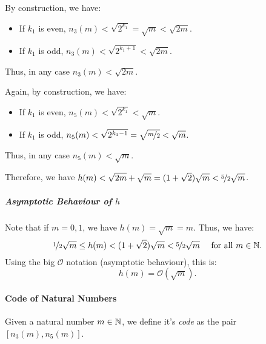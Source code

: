 By construction, we have:
\begin{itemize}
	\item If $k_1$ is even, $n_3(m) < \sqrt{2^{k_1}} = \sqrt{m} < \sqrt{2m}$.
	\item If $k_1$ is odd, $n_3(m) < \sqrt{2^{k_1+1}} < \sqrt{2m}$.
\end{itemize}
Thus, in any case $n_3(m) < \sqrt{2m}$.

Again, by construction, we have:
\begin{itemize}
	\item If $k_1$ is even, $n_5(m) < \sqrt{2^{k_1}} < \sqrt{m}$.
	\item If $k_1$ is odd, $n_5(m) < \sqrt{2^{k_1-1}} = \sqrt{\nicefrac{m}{2}} < \sqrt{m}$.
\end{itemize}
Thus, in any case $n_5(m) < \sqrt{m}$.

Therefore, we have $h(m) < \sqrt{2m} +  \sqrt{m} = (1+\sqrt{2}) \sqrt{m} < \nicefrac{5}{2}\sqrt{m}$.


\subparagraph{Asymptotic Behaviour of $h$}
Note that if $m=0,1$, we have $h(m) = \sqrt{m} = m$.
Thus, we have:
$$
\nicefrac{1}{2}\sqrt{m} \leq h(m) < (1+\sqrt{2}) \sqrt{m} < \nicefrac{5}{2}\sqrt{m} \quad \text{ for all } m \in \mathbb{N}.
$$
Using the big $\mathcal{O}$ notation (asymptotic behaviour), this is:
$$
h(m) = \mathcal{O}(\sqrt{m}).
$$


\paragraph{Code of Natural Numbers}
\label{definitionCode}
Given a natural number $m \in \mathbb{N}$, we define it's \textit{code} as the pair $\left[  n_3(m), n_5(m) \right]$.

